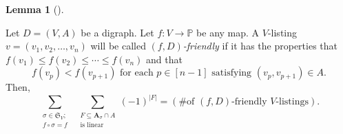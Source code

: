 \documentclass[numbers=enddot,12pt,final,onecolumn,notitlepage]{scrartcl}%
\numberwithin{exer}{section}
\theoremstyle{definition}
\newtheorem{lem}[theo]{Lemma}
\newenvironment{lemma}[1][]
{\begin{lem}[#1]\begin{leftbar}}
{\end{leftbar}\end{lem}}
\let\sumnonlimits\sum
\renewcommand{\sum}{\sumnonlimits\limits}
\begin{document}
\begin{lemma}
\label{lem.friendlies-by-f}Let $D=\left(  V,A\right)  $ be a digraph. Let
$f:V\rightarrow\mathbb{P}$ be any map. A $V$-listing $v=\left(  v_{1}%
,v_{2},\ldots,v_{n}\right)  $ will be called $\left(  f,D\right)
$\emph{-friendly} if it has the properties that $f\left(  v_{1}\right)  \leq
f\left(  v_{2}\right)  \leq\cdots\leq f\left(  v_{n}\right)  $ and that%
\begin{equation}
f\left(  v_{p}\right)  <f\left(  v_{p+1}\right)  \text{ for each }p\in\left[
n-1\right]  \text{ satisfying }\left(  v_{p},v_{p+1}\right)  \in A.
\label{eq.lem.friendlies-by-f.less}%
\end{equation}
Then,%
\[
\sum_{\substack{\sigma\in\mathfrak{S}_{V};\\f\circ\sigma=f}}\ \ \sum
_{\substack{F\subseteq\mathbf{A}_{\sigma}\cap A\\\text{is linear}}}\left(
-1\right)  ^{\left\vert F\right\vert }=\left(  \text{\# of }\left(
f,D\right)  \text{-friendly }V\text{-listings}\right)  .
\]

\end{lemma}
\end{document}
